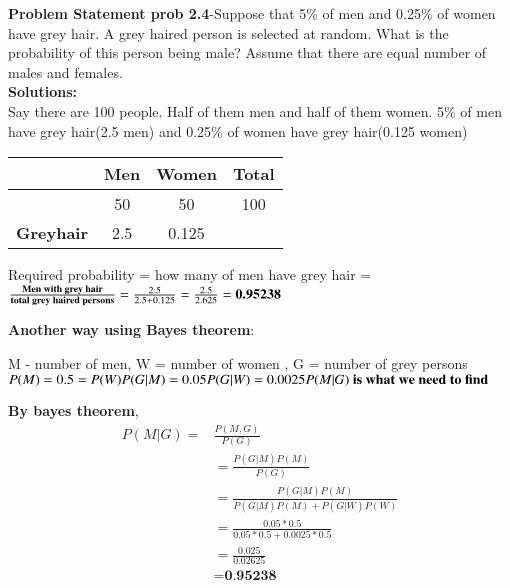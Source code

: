 \documentclass[journal,12pt,twocoloums]{IEEEtran}
\begin{document}
 \maketitle
 
 \textbf{Problem Statement prob 2.4}-Suppose that 5\% of men and 0.25\% of women
have grey hair. A grey haired person is selected at random. What is the probability of this person being male? Assume that there are
equal number of males and females.\\
\textbf{Solutions:}\\
Say there are 100 people. Half of them men and half of them women. 5\% of men have grey hair(2.5 men) and 0.25\% of women have grey hair(0.125 women)


\begin{center}
\begin{tabular}{ |c|c|c|c| } 
\hline
 & \textbf{Men} & \textbf{Women} & \textbf{Total} \\
\hline
 & 50 & 50 & 100 \\ 
\hline
\textbf{Greyhair} & 2.5 & 0.125 & \\ 
 \hline
\end{tabular}
\end{center}


 Required probability = how many of men have grey hair = $\frac{\textbf{Men with grey hair}}{\textbf{total grey haired persons}} \\ = \frac{2.5}{2.5+0.125} \\ = \frac{2.5}{2.625} \\ = \textbf{0.95238} $ 
 
\textbf{ Another way using Bayes theorem}:

M - number of men, W = number of women , G = number of grey persons
$P(M) = 0.5 = P(W) \\ P(G|M) =0.05 \\ P(G|W) = 0.0025 \\ P(M|G) \textbf{ is what we need to find } $

 
\textbf{By bayes theorem}, 
\begin{align*}
P(M|G) =& \frac{P(M,G)}{P(G)} \\
   & = \frac{P(G|M)P(M)}{P(G)} \\
   & = \frac{P(G|M)P(M)}{P(G|M)P(M)+P(G|W)P(W)} \\
   &    = \frac{0.05*0.5}{0.05*0.5+0.0025*0.5}  \\
      & = \frac{0.025}{0.02625}  \\
      & = \textbf{0.95238} 
\end{align*}
\end{document}

